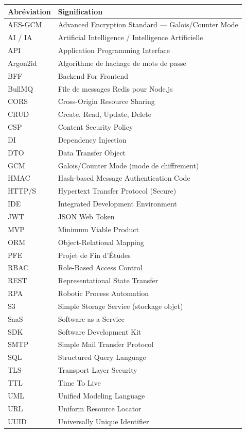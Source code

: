 \documentclass[12pt,a4paper,oneside]{report}
\begin{document}
\vspace{4pt}
\begin{tabular}{@{}p{2.8cm}p{11.5cm}@{}}
\toprule
\textbf{Abréviation} & \textbf{Signification} \\
\midrule
AES-GCM    & Advanced Encryption Standard — Galois/Counter Mode \\
AI / IA    & Artificial Intelligence / Intelligence Artificielle \\
API        & Application Programming Interface \\
Argon2id   & Algorithme de hachage de mots de passe \\
BFF        & Backend For Frontend \\
BullMQ     & File de messages Redis pour Node.js \\
CORS       & Cross-Origin Resource Sharing \\
CRUD       & Create, Read, Update, Delete \\
CSP        & Content Security Policy \\
DI         & Dependency Injection \\
DTO        & Data Transfer Object \\
GCM        & Galois/Counter Mode (mode de chiffrement) \\
HMAC       & Hash-based Message Authentication Code \\
HTTP/S     & Hypertext Transfer Protocol (Secure) \\
IDE        & Integrated Development Environment \\
JWT        & JSON Web Token \\
MVP        & Minimum Viable Product \\
ORM        & Object-Relational Mapping \\
PFE        & Projet de Fin d'Études \\
RBAC       & Role-Based Access Control \\
REST       & Representational State Transfer \\
RPA        & Robotic Process Automation \\
S3         & Simple Storage Service (stockage objet) \\
SaaS       & Software as a Service \\
SDK        & Software Development Kit \\
SMTP       & Simple Mail Transfer Protocol \\
SQL        & Structured Query Language \\
TLS        & Transport Layer Security \\
TTL        & Time To Live \\
UML        & Unified Modeling Language \\
URL        & Uniform Resource Locator \\
UUID       & Universally Unique Identifier \\
\bottomrule
\end{tabular}
\end{document}
